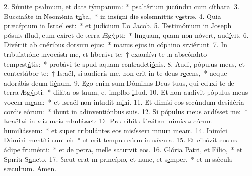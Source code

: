 2. Súmite psalmum, et date t\uline{ý}mpanum:~* psaltérium jucúndm cum c\uline{í}thara.
3. Buccináte in Neoménia t\uline{u}ba,~* in insígni die solemnittis v\uline{e}stræ.
4. Quia præcéptum in Isra\uline{ë}l est:~* et judícium Do J\uline{a}cob.
5. Testimónium in Joseph pósuit illud, cum exíret de terra Æg\uline{ý}pti:~* linguam, quam non nóvert, aud\uline{í}vit.
6. Divértit ab onéribus dorsum \uline{e}jus:~* manus ejus in cóphino srvi\uline{é}runt.
7. In tribulatióne invocásti me, et liberávi te:~† exaudívi te in abscóndito tempest\uline{á}tis:~* probávi te apud aquam contradcti\uline{ó}nis.
8. Audi, pópulus meus, et contestábor te:~† Israël, si audíeris me, non erit in te deus r\uline{e}cens,~* neque adorábis deum li\uline{é}num.
9. Ego enim sum Dóminus Deus tuus, qui edúxi te de terra Æg\uline{ý}pti:~* diláta os tuum, et implbo \uline{i}llud.
10. Et non audívit pópulus meus vocem m\uline{e}am:~* et Israël non intndit m\uline{i}hi.
11. Et dimísi eos secúndum desidéria cordis e\uline{ó}rum:~* ibunt in adinventiónbus s\uline{u}is.
12. Si pópulus meus aud\uline{í}sset me:~* Israël si in viis meis mbul\uline{á}sset:
13. Pro níhilo fórsitan inimícos eórum humili\uline{á}ssem:~* et super tribulántes eos misíssem mnum m\uline{e}am.
14. Inimíci Dómini mentíti sunt \uline{e}i:~* et erit tempus eórm in s\uline{ǽ}cula.
15. Et cibávit eos ex ádipe frum\uline{é}nti:~* et de petra, melle saturvit \uline{e}os.
16. Glória Patri, et F\uline{í}lio,~* et Spiríti S\uline{a}ncto.
17. Sicut erat in princípio, et nunc, et s\uline{e}mper,~* et in sǽcula sæculrum. \uline{A}men.
